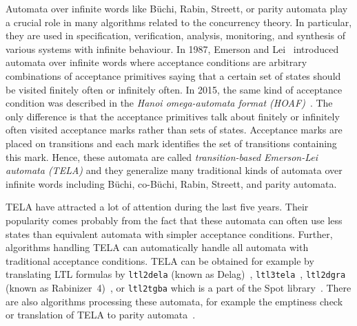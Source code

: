 \documentclass[a4paper,UKenglish,cleveref,autoref,thm-restate]{lipics-v2021}
\begin{document}

Automata over infinite words like Büchi, Rabin, Streett, or parity
automata play a crucial role in many algorithms related to the
concurrency theory. In particular, they are used in specification,
verification, analysis, monitoring, and synthesis of various systems
with infinite behaviour. In 1987, Emerson and
Lei~\cite{emerson.87.scp} introduced automata over infinite words
where acceptance conditions are arbitrary combinations of acceptance
primitives saying that a certain set of states should be visited
finitely often or infinitely often. In 2015, the same kind of
acceptance condition was described in the \emph{Hanoi omega-automata
  format (HOAF)}~\cite{babiak.15.cav}. The only difference is that the
acceptance primitives talk about finitely or infinitely often visited
acceptance marks rather than sets of states.  Acceptance marks are
placed on transitions and each mark identifies the set of transitions
containing this mark. Hence, these automata are called
\emph{transition-based Emerson-Lei automata (TELA)} and they
generalize many traditional kinds of automata over infinite words
including Büchi, co-Büchi, Rabin, Streett, and parity automata.

TELA have attracted a lot of attention during the last five years.
Their popularity comes probably from the fact that these automata can
often use less states than equivalent automata with simpler acceptance
conditions. Further, algorithms handling TELA can automatically handle
all automata with traditional acceptance conditions. TELA can be
obtained for example by translating LTL formulas by \texttt{ltl2dela}
(known as Delag)~\cite{muller.17.gandalf},
\texttt{ltl3tela}~\cite{major.19.atva}, \texttt{ltl2dgra} (known as
Rabinizer~4)~\cite{kretinsky.18.cav}, or \texttt{ltl2tgba} which is a
part of the Spot library~\cite{duret.16.atva2}.  There are also
algorithms processing these automata, for example the emptiness
check~\cite{baier.19.atva} or translation of TELA to parity
automata~\cite{renkin.20.atva,casares.22.tacas}.
\end{document}
